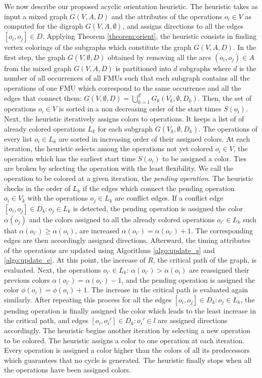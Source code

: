 We now describe our proposed acyclic orientation heuristic. The heuristic takes as input a mixed graph $G(V,A,D)$ and the attributes of the operations $o_i \in V$ as computed for the digraph $G(V,A,\emptyset)$, and assigns directions to all the edges $[o_i,o_j] \in D$. Applying Theorem \ref{theorem:orient}, the heuristic consists in finding vertex colorings of the subgraphs which constitute the graph $G(V,A,D)$. 
In the first step, the graph $G(V,\emptyset,D)$ obtained by removing all the arcs $(o_i,o_j) \in A$ from the mixed graph $G(V,A,D)$ is partitioned into $d$ subgraphs where $d$ is the number of all occurrences of all FMUs such that each subgraph contains all the operations of one FMU which correspond to the same occurrence and all the edges that connect them: $ G(V,\emptyset,D)= \bigcup_{k=1}^d G_k(V_k,\emptyset,D_k)$. Then, the set of operations $o_i \in V$ is sorted in a non decreasing order of the start times $S(o_i)$. Next, the heuristic iteratively assigns colors to operations. 
It keeps a list of of already colored operations $L_k$ for each subgraph $G(V_k,\emptyset,D_k)$. The operations of every list $o_i \in L_k$ are sorted in increasing order of their assigned colors. At each iteration, the heuristic selects among the operations not yet colored $o_i \in V$, the operation which has the earliest start time $S(o_i)$ to be assigned a color. Ties are broken by selecting the operation with the least flexibility. We call the operation to be colored at a given iteration, the \textit{pending operation}. The heuristic checks in the order of $L_k$ if the edges which connect the pending operation $o_i \in V_k$ with the operations $o_j \in L_k$ are conflict edges. 
If a conflict edge $[o_i,o_j] \in D_k: o_j \in L_k$ is detected, the pending operation is assigned the color $\alpha(o_j)$ and the colors assigned to all the already colored operations $o_{i'} \in L_k$ such that $\alpha(o_{i'}) \geq \alpha(o_{i})$, are increased $\alpha(o_{i'}) = \alpha(o_{i'})+1$. The corresponding edges are then accordingly assigned directions. Afterward, the timing attributes of the operations are updated using Algorithms \ref{algo:update_s} and \ref{algo:update_e}. At this point, the increase of $R$, the critical path of the graph, is evaluated. Next, the operations $o_{i'} \in L_k$: $\alpha(o_{i'}) > \alpha(o_{i})$ are reassigned their previous colors $\alpha(o_{i'}) = \alpha(o_{i'})-1$, and the pending operation is assigned the color $\phi(o_i)=\phi(o_i)+1$. The increase in the critical path is evaluated again similarly. After repeating this process for all the edges $[o_i,o_j] \in D_k: o_j \in L_k$, the pending operation is finally assigned the color which leads to the least increase in the critical path, and edges $[o_i,o_i'] \in D_k : o_i' \in l$ are assigned directions accordingly. The heuristic begins another iteration by selecting a new operation to be colored. The heuristic assigns a color to one operation at each iteration. Every operation is assigned a color higher than the colors of all its predecessors which guarantees that no cycle is generated. The heuristic finally stops when all the operations have been assigned colors. 
